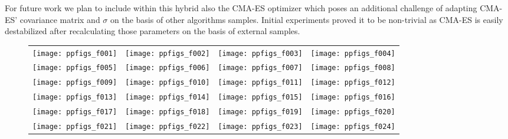 \documentclass[manuscript]{acmart}
\newcommand{\algorithmA}{SHADE-LM (SL-10)}  %
\begin{document}
For future work we plan to include within this hybrid also the CMA-ES
optimizer which poses an additional challenge of adapting CMA-ES' covariance
matrix and $\sigma$ on the basis of other algorithms samples.
Initial experiments proved it to be non-trivial as CMA-ES is easily destabilized
after recalculating those parameters on the basis of external samples.



\begin{figure*}
\centering
\begin{tabular}{@{}c@{}c@{}c@{}c@{}}
\texttt{[image: ppfigs\_f001]}&
\texttt{[image: ppfigs\_f002]}&
\texttt{[image: ppfigs\_f003]}&
\texttt{[image: ppfigs\_f004]}\\
\texttt{[image: ppfigs\_f005]}&
\texttt{[image: ppfigs\_f006]}&
\texttt{[image: ppfigs\_f007]}&
\texttt{[image: ppfigs\_f008]}\\
\texttt{[image: ppfigs\_f009]}&
\texttt{[image: ppfigs\_f010]}&
\texttt{[image: ppfigs\_f011]}&
\texttt{[image: ppfigs\_f012]}\\
\texttt{[image: ppfigs\_f013]}&
\texttt{[image: ppfigs\_f014]}&
\texttt{[image: ppfigs\_f015]}&
\texttt{[image: ppfigs\_f016]}\\
\texttt{[image: ppfigs\_f017]}&
\texttt{[image: ppfigs\_f018]}&
\texttt{[image: ppfigs\_f019]}&
\texttt{[image: ppfigs\_f020]}\\
\texttt{[image: ppfigs\_f021]}&
\texttt{[image: ppfigs\_f022]}&
\texttt{[image: ppfigs\_f023]}&
\texttt{[image: ppfigs\_f024]}
\end{tabular}
\vspace*{-0.2cm}
\caption[Expected running time divided by dimension
versus dimension]{
\label{fig:scaling}
}
% 
\end{figure*}
\end{document}
